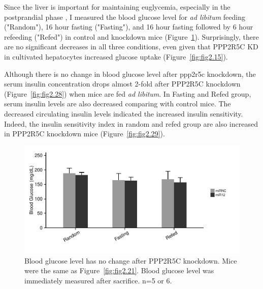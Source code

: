 Since the liver is important for maintaining euglycemia, especially in the postprandial phase \cite{moore_regulation_2012}, I measured the blood glucose level for \textit{ad libitum} feeding ("Random"), 16 hour fasting ("Fasting"), and 16 hour fasting followed by 6 hour refeeding ("Refed") in control and knockdown mice (Figure~\ref{fig:fig2.26}). Surprisingly, there are no significant decreases in all three conditions, even given that PPP2R5C KD in cultivated hepatocytes increased glucose uptake (Figure~\ref{fig:fig2.15}). 

Although there is no change in blood glucose level after \gls{ppp2r5c} knockdown, the serum insulin concentration drops almost 2-fold after PPP2R5C knockdown (Figure~\ref{fig:fig2.28}) when mice are fed \textit{ad libitum}. In Fasting and Refed group, serum insulin levels are also decreased comparing with control mice. The decreased circulating insulin levels indicated the increased insulin sensitivity. Indeed, the insulin sensitivity index \cite{wallace_use_2004} in random and refed group are also increased in PPP2R5C knockdown mice (Figure~\ref{fig:fig2.29}). 

\begin{figure}[htbp]
\centering
\includegraphics[width=1\textwidth]{figs/fig2-26 blood glucose.pdf}
\caption[Blood glucose after PPP2R5C KD]{\footnotesize Blood glucose level has no change after PPP2R5C knockdown. Mice were the same as Figure~\ref{fig:fig2.21}. Blood glucose level was immediately measured after sacrifice. n=5 or 6.}
\label{fig:fig2.26}
\end{figure}

